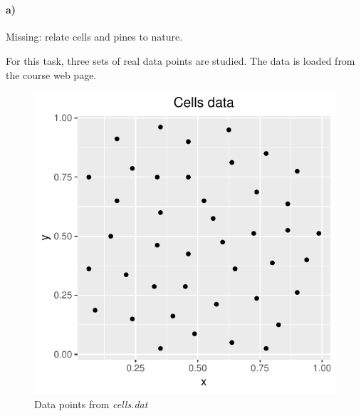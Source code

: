 \section{}
\label{sec:problem1}
\paragraph{a)} Missing: relate cells and pines to nature.

For this task, three sets of real data points are studied. The data is loaded from the course web page.

\begin{figure}
    \centering
    \includegraphics[scale=0.95]{figures/prob1_cells_points.pdf}
    \caption{Data points from \textit{cells.dat}}
    \label{fig:cells_points}
\end{figure}

